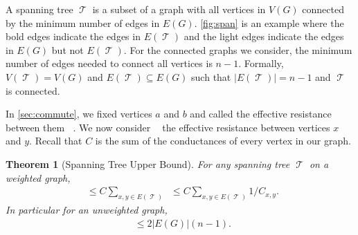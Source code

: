 \documentclass[12pt]{article}
\newtheorem{theorem}{Theorem}
\theoremstyle{definition}
\DeclareMathOperator{\tcov}{t_\textrm{cov}}      %
\DeclareMathOperator{\Reff}{R_{\textrm{eff}}}    %
\DeclareMathOperator{\Rxy}{R_{\textrm{x,y}}}     %
\DeclareMathOperator{\T}{\mathcal{T}}            %
\begin{document}
A spanning tree $\T$ is a subset of a graph with all vertices 
in $V(G)$ connected by the minimum number of edges in $E(G)$.
\cref{fig:span} is an example where the bold edges indicate the edges in $E(\T)$
and the light edges indicate the edges in $E(G)$ but not $E(\T)$.
For the connected graphs we consider, the minimum number of edges
needed to connect all vertices is $n-1$.
Formally, $V(\T) = V(G)$ and $E(\T) \subseteq E(G)$
such that $|E(\T)| = n-1$ and $\T$ is connected.


In \cref{sec:commute}, we fixed vertices $a$ and $b$ and called
the effective resistance between them $\Reff$.
We now consider $\Rxy$ the effective resistance between vertices $x$ and $y$.
Recall that $C$ is the sum of the conductances of every vertex in our graph.

\begin{theorem}[Spanning Tree Upper Bound] \label{thm:span}
For any spanning tree $\T$ on a weighted graph,
\begin{align}
\tcov \leq C \sum_{x,y \in E(\T)} \Rxy \leq C \sum_{x,y \in E(\T)} 1 / C_{x,y}. \nonumber
\end{align}
In particular for an unweighted graph,
\begin{align}
\tcov \leq 2 |E(G)| (n-1). \nonumber 
\end{align}
\end{theorem}
\end{document}
